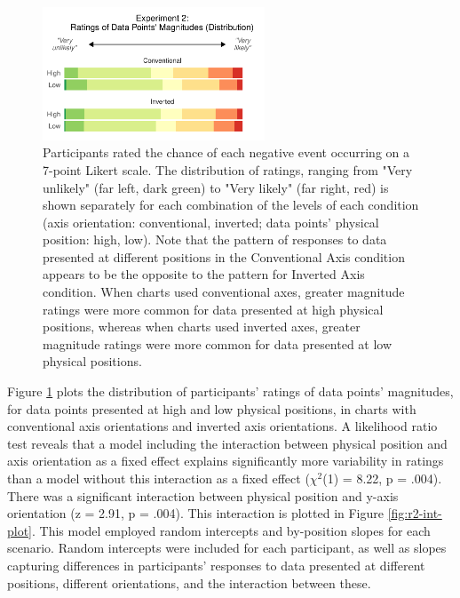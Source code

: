 \documentclass[journal]{vgtc}                %
\begin{document}
\begin{figure}
\includegraphics[width=250px]{position_magnitude_files/figure-latex/r2-c-plot-1} \caption{Participants rated the chance of each negative event occurring on a 7-point Likert scale. The distribution of ratings, ranging from "Very unlikely" (far left, dark green) to "Very likely" (far right, red) is shown separately for each combination of the levels of each condition (axis orientation: conventional, inverted; data points' physical position: high, low). Note that the pattern of responses to data presented at different positions in the Conventional Axis condition appears to be the opposite to the pattern for Inverted Axis condition. When charts used conventional axes, greater magnitude ratings were more common for data presented at high physical positions, whereas when charts used inverted axes, greater magnitude ratings were more common for data presented at low physical positions.}\label{fig:r2-c-plot}
\end{figure}

Figure \ref{fig:r2-c-plot} plots the distribution of participants'
ratings of data points' magnitudes, for data points presented at high
and low physical positions, in charts with conventional axis
orientations and inverted axis orientations. A likelihood ratio test
reveals that a model including the interaction between physical position
and axis orientation as a fixed effect explains significantly more
variability in ratings than a model without this interaction as a fixed
effect (\(\chi^2\)(1) = 8.22, p
= .004). There was a significant
interaction between physical position and y-axis orientation (z =
2.91, p
= .004). This
interaction is plotted in Figure \ref{fig:r2-int-plot}. This model
employed random intercepts and by-position slopes for each scenario.
Random intercepts were included for each participant, as well as slopes
capturing differences in participants' responses to data presented at
different positions, different orientations, and the interaction between
these.
\end{document}
